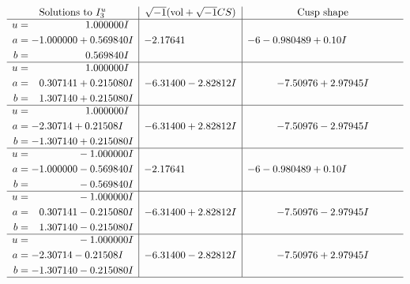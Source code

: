 \documentclass[1p]{elsarticle_modified}
\theoremstyle{definition}
\newcommand{\I}{\sqrt{-1}}
\begin{document}
$$\begin{array}{c|c|c}  
\text{Solutions to }I^u_{3}& \I (\text{vol} + \sqrt{-1}CS) & \text{Cusp shape}\\
 \hline 
\begin{aligned}
u &= \phantom{-0.000000 -}1.000000 I \\
a &= -1.000000 + 0.569840 I \\
b &= \phantom{-0.000000 -}0.569840 I\end{aligned}
 & -2.17641\phantom{ +0.000000I} &                  -6
-0.980489 + 0. 10   I\phantom{ +0.000000I} \\ \hline\begin{aligned}
u &= \phantom{-0.000000 -}1.000000 I \\
a &= \phantom{-}0.307141 + 0.215080 I \\
b &= \phantom{-}1.307140 + 0.215080 I\end{aligned}
 & -6.31400 - 2.82812 I & -7.50976 + 2.97945 I \\ \hline\begin{aligned}
u &= \phantom{-0.000000 -}1.000000 I \\
a &= -2.30714 + 0.21508 I \\
b &= -1.307140 + 0.215080 I\end{aligned}
 & -6.31400 + 2.82812 I & -7.50976 - 2.97945 I \\ \hline\begin{aligned}
u &= \phantom{-0.000000 } -1.000000 I \\
a &= -1.000000 - 0.569840 I \\
b &= \phantom{-0.000000 } -0.569840 I\end{aligned}
 & -2.17641\phantom{ +0.000000I} &                  -6
-0.980489 + 0. 10   I\phantom{ +0.000000I} \\ \hline\begin{aligned}
u &= \phantom{-0.000000 } -1.000000 I \\
a &= \phantom{-}0.307141 - 0.215080 I \\
b &= \phantom{-}1.307140 - 0.215080 I\end{aligned}
 & -6.31400 + 2.82812 I & -7.50976 - 2.97945 I \\ \hline\begin{aligned}
u &= \phantom{-0.000000 } -1.000000 I \\
a &= -2.30714 - 0.21508 I \\
b &= -1.307140 - 0.215080 I\end{aligned}
 & -6.31400 - 2.82812 I & -7.50976 + 2.97945 I\\
 \hline 
 \end{array}$$\newpage
\end{document}
